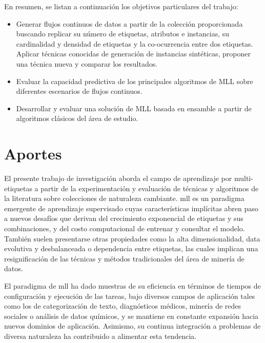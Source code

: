 En resumen, se listan a continuación los objetivos particulares del trabajo:

\begin{itemize}

	\item Generar flujos continuos de datos a partir de la colección
	      proporcionada buscando replicar su número de etiquetas, atributos e
	      instancias, su cardinalidad y densidad de etiquetas y la co-ocurrencia
	      entre dos etiquetas. Aplicar técnicas conocidas de generación de
	      instancias sintéticas, proponer una técnica nueva y comparar los
	      resultados.

	\item Evaluar la capacidad predictiva de los principales algoritmos de MLL
	      sobre diferentes escenarios de flujos continuos.

	\item Desarrollar y evaluar una solución de MLL basada en ensamble a partir
	      de algoritmos clásicos del área de estudio.

\end{itemize}


\section{Aportes}

El presente  trabajo de investigación aborda el campo de aprendizaje por
multi-etiquetas a partir de la experimentación y evaluación de técnicas y
algoritmos de la literatura sobre colecciones de naturaleza cambiante.
\acrshort{mll} es un paradigma emergente de aprendizaje supervisado cuyas
características implícitas abren paso a nuevos desafíos que derivan del
crecimiento exponencial de etiquetas y sus combinaciones, y del costo
computacional de entrenar y consultar el modelo. También suelen presentarse
otras propiedades como la alta dimensionalidad, data evolutiva y desbalanceada o
dependencia entre etiquetas, las cuales implican una resignificación de las
técnicas y métodos tradicionales del área de minería de datos.

El paradigma de \acrshort{mll} ha dado muestras de su eficiencia en términos de
tiempos de configuración y ejecución de las tareas, bajo diversos campos de
aplicación tales como los de categorización de texto, diagnósticos médicos,
minería de redes sociales o análisis de datos químicos, y se mantiene en
constante expansión hacia nuevos dominios de aplicación. Asimismo, su continua
integración a problemas de diversa naturaleza ha contribuido a alimentar esta
tendencia.

